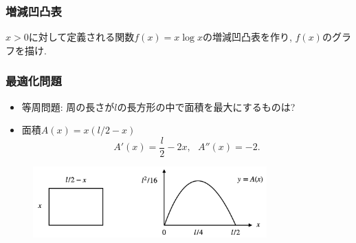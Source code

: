 


\begin{frame}
\frametitle{増減凹凸表}

\begin{Prob}
$x>0$に対して定義される関数$f(x)=x\log x$の増減凹凸表を作り, $f(x)$のグラフを描け. 
\end{Prob}

\vspace{5.5cm}

\end{frame}



\begin{frame}
\frametitle{最適化問題}   

\begin{itemize}
\item 等周問題: 周の長さが$l$の長方形の中で面積を最大にするものは? 
\item 面積$A(x)=x(l/2-x)$
$$
A'(x)=\frac{l}{2}-2x, \ \ \ A''(x)=-2. 
$$
\end{itemize}

 \begin{figure}[htbp]
 \begin{center} 
  \includegraphics[width=90mm]{calculus7/LecArea.png}
 \end{center}
\end{figure}

\end{frame}










